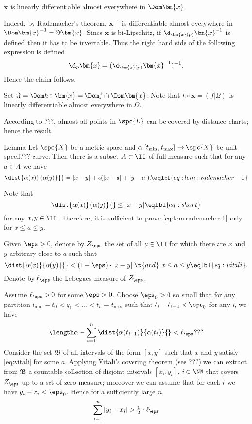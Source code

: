 \begin{clm}{}
$\bm{x}$ is linearly differentiable almost everywhere in $\Dom \bm{x}$.
\end{clm}


Indeed, by Rademacher's theorem,
$\bm{x}^{-1}$ is differentiable almost everywhere in $\Dom\bm{x}^{-1}=\Im \bm{x}$.
Since $\bm{x}$ is bi-Lipschitz,  
if $\d_{\bm{x}(p)}\bm{x}^{-1}$ is defined then it has to be invertable.
Thus the right hand side of the following expression is defined
\[\d_p\bm{x}
=
(\d_{\bm{x}(p)}\bm{x}^{-1})^{-1}.\]
Hence the claim follows. 
\claimqeds

Set $\Omega=\Dom h\circ \bm{x}=\Dom f\cap \Dom \bm{x}$.
Note that $h\circ \bm{x}=(f|\Omega)$ is linearly differentiable almost everywhere in $\Omega$.

According to ???, almost all points in $\spc{L}$ can be covered by distance charts;
hence the result.
\qeds


\begin{thm}{Lemma}
Let $\spc{X}$ be a metric space 
and $\alpha\:[t_{\min},t_{\max}]\to\spc{X}$ be unit-speed??? curve.
Then there is a subset $A\subset \II$ of full measure 
such that for any $a\in A$ we have 
\[\dist{\alpha(x)}{\alpha(y)}{}=|x-y|+o(|x-a|+|y-a|).
\eqlbl{eq:lem:rademacher-1}\]
\end{thm}

Note that
\[\dist{\alpha(x)}{\alpha(y)}{}\le|x-y|
\eqlbl{eq:short}
\]
for any $x,y\in\II$.
Therefore, it is sufficient to prove \ref{eq:lem:rademacher-1} only for $x\le a\le y$.

Given $\eps>0$, denote by $Z_{\eps}$
the set of all $a\in\II$ for which 
there are $x$ and $y$ arbitrary close to $a$
such that 
\[\dist{\alpha(x)}{\alpha(y)}{}<(1-\eps)\cdot|x-y|
\ \t{and}\ 
x\le a\le y
\eqlbl{eq:vitali}.\]
Denote by $\ell_\eps$ the Lebegues measure of $Z_\eps$.

Assume $\ell_\eps>0$ for some $\eps>0$. 
Choose $\eps_0>0$ so small that for
any partition $t_{\min}= t_0 < y_1 <\dots <t_n = t_{\max}$ such that $t_i-t_{i-1}<\eps_0$ for any $i$, 
we have
\[
\length\alpha
-
\sum_{i=1}^n\dist{\alpha(t_{i-1})}{\alpha(t_i)}{}
<
\ell_\eps???
\]
Consider the set $\mathfrak B$ of all intervals of
the form $[x,y]$ such that $x$ and $y$ satisfy \ref{eq:vitali} for some $a$.
Applying Vitali's covering theorem (see ???)
we can extract from $\mathfrak B$ a countable collection of disjoint
intervals $[x_i,y_i]$, $i\in\NN$ that covers $Z_\eps$ up to a set of zero measure;
moreover we can assume that for each $i$ we have $y_i-x_i<\eps_0$. 
Hence for a sufficiently large $n$, 
\[\sum_{i=1}^n|y_i-x_i|>\tfrac12\cdot\ell_\eps\]

